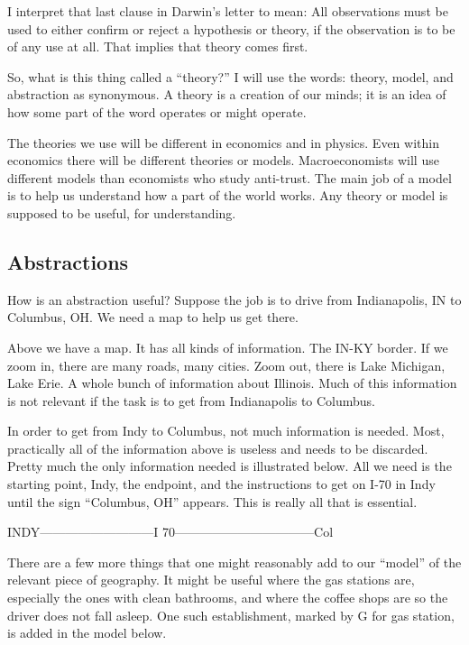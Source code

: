 \documentclass[
]{book}
\begin{document}
I interpret that last clause in Darwin's letter to mean: All observations must be used to either confirm or reject a hypothesis or theory, if the observation is to be of any use at all. That implies that theory comes first.

So, what is this thing called a ``theory?'' I will use the words: theory, model, and abstraction as synonymous. A theory is a creation of our minds; it is an idea of how some part of the word operates or might operate.

The theories we use will be different in economics and in physics. Even within economics there will be different theories or models. Macroeconomists will use different models than economists who study anti-trust. The main job of a model is to help us understand how a part of the world works. Any theory or model is supposed to be useful, for understanding.

\hypertarget{abstractions}{%
\subsection{Abstractions}\label{abstractions}}

How is an abstraction useful? Suppose the job is to drive from Indianapolis, IN to Columbus, OH. We need a map to help us get there.

\newpage{}

Above we have a map. It has all kinds of information. The IN-KY border. If we zoom in, there are many roads, many cities. Zoom out, there is Lake Michigan, Lake Erie. A whole bunch of information about Illinois. Much of this information is not relevant if the task is to get from Indianapolis to Columbus.

In order to get from Indy to Columbus, not much information is needed. Most, practically all of the information above is useless and needs to be discarded. Pretty much the only information needed is illustrated below. All we need is the starting point, Indy, the endpoint, and the instructions to get on I-70 in Indy until the sign ``Columbus, OH'' appears. This is really all that is essential.

INDY---------------------------I 70---------------------------------Col

There are a few more things that one might reasonably add to our ``model'' of the relevant piece of geography. It might be useful where the gas stations are, especially the ones with clean bathrooms, and where the coffee shops are so the driver does not fall asleep. One such establishment, marked by G for gas station, is added in the model below.
\end{document}
